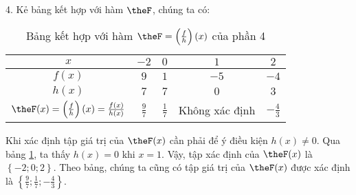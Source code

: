 4. Kẻ bảng kết hợp với hàm $\theF$, chúng ta có:

\begin{table}[H]
   \centering
   \begin{tabular}{|c|c|c|c|c|}
      \hline
      $x$ & $-2$ & $0$ & $1$ & $2$ \\
      \hline
      $f(x)$ & $9$ & $1$ & $-5$ & $-4$ \\
      \hline
      $h(x)$ & $7$ & $7$ & $0$ & $3$ \\
      \hline
      $\theF(x) = \left(\frac{f}{h}\right)(x) = \frac{f(x)}{h(x)}$ & $\frac{9}{7}$ & $\frac{1}{7}$ & Không xác định & $-\frac{4}{3}$ \\
      \hline
   \end{tabular}
   \caption{Bảng kết hợp với hàm $\theF = \left(\frac{f}{h}\right)(x)$ của phần 4}
   \label{tab:ham_so_mot_bien:phep_tinh_ham:theF_4}
\end{table}

Khi xác định tập giá trị của $\theF(x)$ cần phải để ý điều kiện $h(x) \neq 0$. Qua bảng \ref{tab:ham_so_mot_bien:phep_tinh_ham:theF_4}, ta thấy $h(x) = 0$ khi $x=1$. Vậy, tập xác định của $\theF(x)$ là $\left\{-2; 0; 2\right\}$. Theo bảng, chúng ta cũng có tập giá trị của $\theF(x)$ được xác định là $\left\{\frac{9}{7}; \frac{1}{7}; -\frac{4}{3}\right\}$.